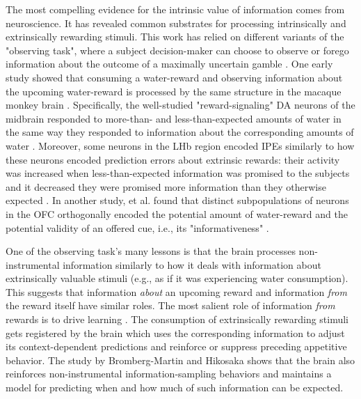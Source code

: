 The most compelling evidence for the intrinsic value of information comes from neuroscience. It has revealed common substrates for processing intrinsically and extrinsically rewarding stimuli. This work has relied on different variants of the "observing task", where a subject decision-maker can choose to observe or forego information about the outcome of a maximally uncertain gamble \cite[reviewed in][]{kidd_psychology_2015,cervera_systems_2020}. One early study showed that consuming a water-reward and observing information about the upcoming water-reward is processed by the same structure in the macaque monkey brain \cite{bromberg-martin_midbrain_2009}. Specifically, the well-studied "reward-signaling" \acf{DA} neurons of the midbrain \cite{schultz_neural_1997} responded to more-than- and less-than-expected amounts of water in the same way they responded to information about the corresponding amounts of water \cite{bromberg-martin_midbrain_2009}. Moreover, some neurons in the \acf{LHb} region encoded \acp{IPE} similarly to how these neurons encoded prediction errors about extrinsic rewards: their activity was increased when less-than-expected information was promised to the subjects and it decreased they were promised more information than they otherwise expected \cite{bromberg-martin_lateral_2011}. In another study, \citeauthor{blanchard_orbitofrontal_2015} et al. found that distinct subpopulations of neurons in the \ac{OFC} orthogonally encoded the potential amount of water-reward and the potential validity of an offered cue, i.e., its "informativeness" \cite{blanchard_orbitofrontal_2015}.

One of the observing task's many lessons is that the brain processes non-instrumental information similarly to how it deals with information about extrinsically valuable stimuli (e.g., as if it was experiencing water consumption). This suggests that information \emph{about} an upcoming reward and information \emph{from} the reward itself have similar roles. The most salient role of information \emph{from} rewards is to drive learning \cite{schultz_dopamine_2016}. The consumption of extrinsically rewarding stimuli gets registered by the brain which uses the corresponding information to adjust its context-dependent predictions and reinforce or suppress preceding appetitive behavior. The study by Bromberg-Martin and Hikosaka \cite{bromberg-martin_midbrain_2009} shows that the brain also reinforces non-instrumental information-sampling behaviors and maintains a model for predicting when and how much of such information can be expected.

